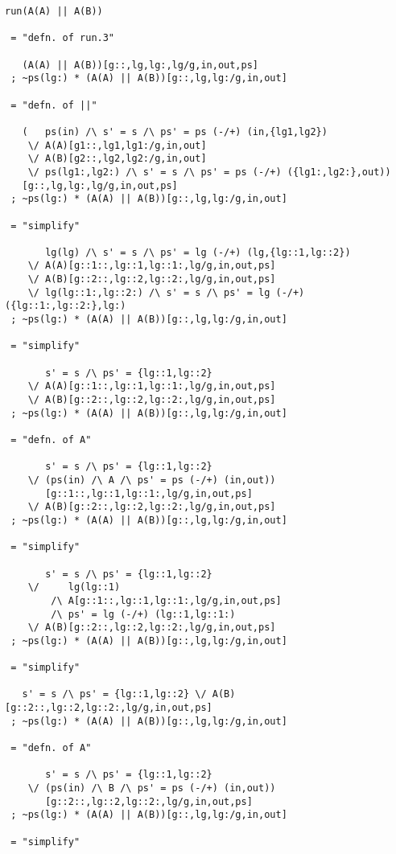 \newpage
{}
\begin{verbatim}
run(A(A) || A(B))

 = "defn. of run.3"

   (A(A) || A(B))[g::,lg,lg:,lg/g,in,out,ps]
 ; ~ps(lg:) * (A(A) || A(B))[g::,lg,lg:/g,in,out]

 = "defn. of ||"

   (   ps(in) /\ s' = s /\ ps' = ps (-/+) (in,{lg1,lg2})
    \/ A(A)[g1::,lg1,lg1:/g,in,out]
    \/ A(B)[g2::,lg2,lg2:/g,in,out]
    \/ ps(lg1:,lg2:) /\ s' = s /\ ps' = ps (-/+) ({lg1:,lg2:},out))
   [g::,lg,lg:,lg/g,in,out,ps]
 ; ~ps(lg:) * (A(A) || A(B))[g::,lg,lg:/g,in,out]

 = "simplify"

       lg(lg) /\ s' = s /\ ps' = lg (-/+) (lg,{lg::1,lg::2})
    \/ A(A)[g::1::,lg::1,lg::1:,lg/g,in,out,ps]
    \/ A(B)[g::2::,lg::2,lg::2:,lg/g,in,out,ps]
    \/ lg(lg::1:,lg::2:) /\ s' = s /\ ps' = lg (-/+) ({lg::1:,lg::2:},lg:)
 ; ~ps(lg:) * (A(A) || A(B))[g::,lg,lg:/g,in,out]

 = "simplify"

       s' = s /\ ps' = {lg::1,lg::2}
    \/ A(A)[g::1::,lg::1,lg::1:,lg/g,in,out,ps]
    \/ A(B)[g::2::,lg::2,lg::2:,lg/g,in,out,ps]
 ; ~ps(lg:) * (A(A) || A(B))[g::,lg,lg:/g,in,out]

 = "defn. of A"

       s' = s /\ ps' = {lg::1,lg::2}
    \/ (ps(in) /\ A /\ ps' = ps (-/+) (in,out))
       [g::1::,lg::1,lg::1:,lg/g,in,out,ps]
    \/ A(B)[g::2::,lg::2,lg::2:,lg/g,in,out,ps]
 ; ~ps(lg:) * (A(A) || A(B))[g::,lg,lg:/g,in,out]

 = "simplify"

       s' = s /\ ps' = {lg::1,lg::2}
    \/     lg(lg::1)
        /\ A[g::1::,lg::1,lg::1:,lg/g,in,out,ps]
        /\ ps' = lg (-/+) (lg::1,lg::1:)
    \/ A(B)[g::2::,lg::2,lg::2:,lg/g,in,out,ps]
 ; ~ps(lg:) * (A(A) || A(B))[g::,lg,lg:/g,in,out]

 = "simplify"

   s' = s /\ ps' = {lg::1,lg::2} \/ A(B)[g::2::,lg::2,lg::2:,lg/g,in,out,ps]
 ; ~ps(lg:) * (A(A) || A(B))[g::,lg,lg:/g,in,out]

 = "defn. of A"

       s' = s /\ ps' = {lg::1,lg::2}
    \/ (ps(in) /\ B /\ ps' = ps (-/+) (in,out))
       [g::2::,lg::2,lg::2:,lg/g,in,out,ps]
 ; ~ps(lg:) * (A(A) || A(B))[g::,lg,lg:/g,in,out]

 = "simplify"


\end{verbatim}

